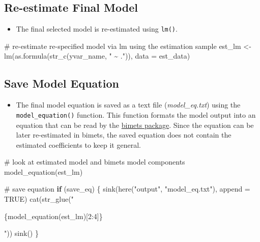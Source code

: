 \documentclass[
  letterpaper,
  DIV=11,
  numbers=noendperiod]{scrreport}
\newenvironment{Shaded}{\begin{snugshade}}{\end{snugshade}}
\newcommand{\AttributeTok}[1]{\textcolor[rgb]{0.40,0.45,0.13}{#1}}
\newcommand{\CommentTok}[1]{\textcolor[rgb]{0.37,0.37,0.37}{#1}}
\newcommand{\ConstantTok}[1]{\textcolor[rgb]{0.56,0.35,0.01}{#1}}
\newcommand{\ControlFlowTok}[1]{\textcolor[rgb]{0.00,0.23,0.31}{\textbf{#1}}}
\newcommand{\FunctionTok}[1]{\textcolor[rgb]{0.28,0.35,0.67}{#1}}
\newcommand{\NormalTok}[1]{\textcolor[rgb]{0.00,0.23,0.31}{#1}}
\newcommand{\OtherTok}[1]{\textcolor[rgb]{0.00,0.23,0.31}{#1}}
\newcommand{\StringTok}[1]{\textcolor[rgb]{0.13,0.47,0.30}{#1}}
\providecommand{\tightlist}{%
  \setlength{\itemsep}{0pt}\setlength{\parskip}{0pt}}\usepackage{longtable,booktabs,array}
\begin{document}
\subsection{Re-estimate Final Model}\label{re-estimate-final-model}

\begin{itemize}
\tightlist
\item
  The final selected model is re-estimated using \texttt{lm()}.
\end{itemize}

\begin{Shaded}
\begin{Highlighting}[]
\CommentTok{\# re{-}estimate re{-}specified model via lm using the estimation sample}
\NormalTok{  est\_lm }\OtherTok{\textless{}{-}} \FunctionTok{lm}\NormalTok{(}\FunctionTok{as.formula}\NormalTok{(}\FunctionTok{str\_c}\NormalTok{(yvar\_name, }\StringTok{" \textasciitilde{} ."}\NormalTok{)), }\AttributeTok{data =}\NormalTok{ est\_data)}
\end{Highlighting}
\end{Shaded}

\subsection{Save Model Equation}\label{save-model-equation}

\begin{itemize}
\tightlist
\item
  The final model equation is saved as a text file
  (\emph{model\_eq.txt}) using the \texttt{model\_equation()} function.
  This function formats the model output into an equation that can be
  read by the \href{https://github.com/andrea-luciani/bimets}{bimets
  package}. Since the equation can be later re-estimated in bimets, the
  saved equation does not contain the estimated coefficients to keep it
  general.
\end{itemize}

\begin{Shaded}
\begin{Highlighting}[]
\CommentTok{\# look at estimated model and bimets model components}
\FunctionTok{model\_equation}\NormalTok{(est\_lm)}

\CommentTok{\# save equation}
\ControlFlowTok{if}\NormalTok{ (save\_eq) \{}
  \FunctionTok{sink}\NormalTok{(}\FunctionTok{here}\NormalTok{(}\StringTok{"output"}\NormalTok{, }\StringTok{"model\_eq.txt"}\NormalTok{), }\AttributeTok{append =} \ConstantTok{TRUE}\NormalTok{)}
  \FunctionTok{cat}\NormalTok{(}\FunctionTok{str\_glue}\NormalTok{(}\StringTok{"}

\StringTok{    \{model\_equation(est\_lm)[2:4]\}}

\StringTok{  "}\NormalTok{))}
  \FunctionTok{sink}\NormalTok{()}
\NormalTok{\}}
\end{Highlighting}
\end{Shaded}
\end{document}

